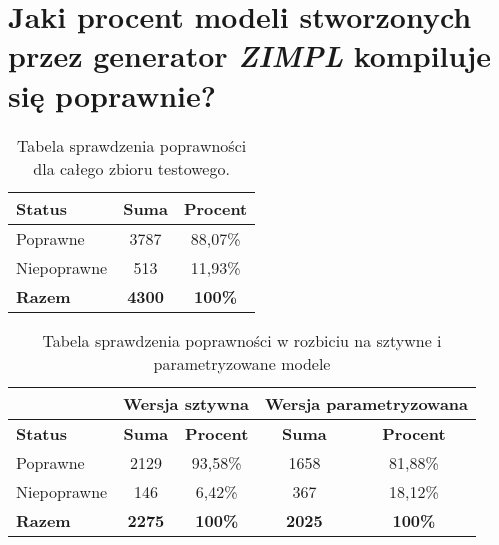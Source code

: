 
\section{Jaki procent modeli stworzonych przez generator  \textit{ZIMPL} kompiluje się poprawnie?}

\begin{table}
\caption{Tabela sprawdzenia poprawności dla całego zbioru testowego.}\label{tab:experiment:compilation}
\centering%
\begin{tabular}{|l|c|c|}
\hline
\textbf{Status} & \textbf{Suma} & \textbf{Procent} \\
\hline
Poprawne & 3787 & 88,07\% \\
\hline
Niepoprawne & 513 & 11,93\% \\
\hline
\textbf{Razem} & \textbf{4300} & \textbf{100\%} \\
\hline
\end{tabular}
\end{table}


\begin{table}
\caption{Tabela sprawdzenia poprawności w rozbiciu na sztywne i parametryzowane modele}\label{tab:experiment:compilation:breakdown}
\centering%
\begin{tabular}{|l|c|c|c|c|}
\hline%
	&\multicolumn{2}{c|}{Wersja sztywna}&\multicolumn{2}{c|}{Wersja parametryzowana}\\
\hline
\textbf{Status} & \textbf{Suma} & \textbf{Procent} & \textbf{Suma} & \textbf{Procent} \\
\hline
Poprawne & 2129 & 93,58\% & 1658 & 81,88\% \\
\hline
Niepoprawne & 146 & 6,42\% & 367 & 18,12\%\\
\hline
\textbf{Razem} & \textbf{2275} & \textbf{100\%} &\textbf{2025} & \textbf{100\%} \\
\hline
\end{tabular}
\end{table}

